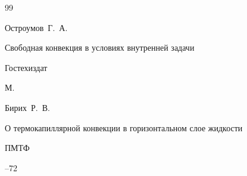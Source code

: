 \begin{thebibliography}{99}












\by Остроумов~Г.~А.

\book Свободная конвекция в условиях внутренней задачи


\publ Гостехиздат

\publaddr М.













\by Бирих~Р.~В.

\paper О термокапиллярной конвекции в горизонтальном слое жидкости

\jour ПМТФ




--72








\end{thebibliography}

